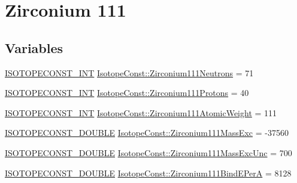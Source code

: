 \hypertarget{group___isotope_const-_zirconium-_zr111}{}\section{Zirconium 111}
\label{group___isotope_const-_zirconium-_zr111}
\subsection*{Variables}
\begin{DoxyCompactItemize}
\item 
\mbox{\hyperlink{group___isotope_const-_macros_ga5f18360b3e99483a35c32d789e62621c}{I\+S\+O\+T\+O\+P\+E\+C\+O\+N\+S\+T\+\_\+\+I\+NT}} \mbox{\hyperlink{group___isotope_const-_zirconium-_zr111_ga433c32de525215a53f355a7df5bc33e4}{Isotope\+Const\+::\+Zirconium111\+Neutrons}} = 71
\item 
\mbox{\hyperlink{group___isotope_const-_macros_ga5f18360b3e99483a35c32d789e62621c}{I\+S\+O\+T\+O\+P\+E\+C\+O\+N\+S\+T\+\_\+\+I\+NT}} \mbox{\hyperlink{group___isotope_const-_zirconium-_zr111_gae8b0d92f84d1e851fed6685b80c57a18}{Isotope\+Const\+::\+Zirconium111\+Protons}} = 40
\item 
\mbox{\hyperlink{group___isotope_const-_macros_ga5f18360b3e99483a35c32d789e62621c}{I\+S\+O\+T\+O\+P\+E\+C\+O\+N\+S\+T\+\_\+\+I\+NT}} \mbox{\hyperlink{group___isotope_const-_zirconium-_zr111_ga1a243aba471a170582c1c010f34317e0}{Isotope\+Const\+::\+Zirconium111\+Atomic\+Weight}} = 111
\item 
\mbox{\hyperlink{group___isotope_const-_macros_ga8f45a7272ce02c0b4c65c44636ed719a}{I\+S\+O\+T\+O\+P\+E\+C\+O\+N\+S\+T\+\_\+\+D\+O\+U\+B\+LE}} \mbox{\hyperlink{group___isotope_const-_zirconium-_zr111_gacfbc5eb7da3db9b2b33c4b37ebeb9e14}{Isotope\+Const\+::\+Zirconium111\+Mass\+Exc}} = -\/37560
\item 
\mbox{\hyperlink{group___isotope_const-_macros_ga8f45a7272ce02c0b4c65c44636ed719a}{I\+S\+O\+T\+O\+P\+E\+C\+O\+N\+S\+T\+\_\+\+D\+O\+U\+B\+LE}} \mbox{\hyperlink{group___isotope_const-_zirconium-_zr111_ga3353e7b4d39f34a8bfd3da83f46c9b18}{Isotope\+Const\+::\+Zirconium111\+Mass\+Exc\+Unc}} = 700
\item 
\mbox{\hyperlink{group___isotope_const-_macros_ga8f45a7272ce02c0b4c65c44636ed719a}{I\+S\+O\+T\+O\+P\+E\+C\+O\+N\+S\+T\+\_\+\+D\+O\+U\+B\+LE}} \mbox{\hyperlink{group___isotope_const-_zirconium-_zr111_gaa2992ace0425505ca25d94c386809d1d}{Isotope\+Const\+::\+Zirconium111\+Bind\+E\+PerA}} = 8128
\item 

\end{DoxyCompactItemize}
